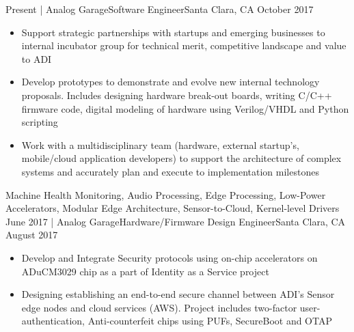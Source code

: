 %
%
%

\begin{experiences}
  \experience
    {Present}   {| Analog Garage}{Software Engineer}{Santa Clara, CA}
    {October 2017} {
                      \begin{itemize}
                        \item Support strategic partnerships with startups and emerging businesses to internal incubator group for technical merit, competitive landscape and value to ADI
                        \item Develop prototypes to demonstrate and evolve new internal technology proposals. Includes designing hardware break-out boards, writing C/C++ firmware code, digital modeling of hardware using Verilog/VHDL and Python scripting
                        \item Work with a multidisciplinary team (hardware, external startup’s, mobile/cloud application developers) to support the architecture of complex systems and accurately plan and execute to implementation milestones\\
                      \end{itemize}
                    }
                    {Machine Health Monitoring, Audio Processing, Edge Processing, Low-Power Accelerators, Modular Edge Architecture, Sensor-to-Cloud, Kernel-level Drivers}
  \emptySeparator
  \experience
    {June 2017}       {| Analog Garage}{Hardware/Firmware Design Engineer}{Santa Clara, CA}
    {August 2017}    {
                      \begin{itemize}
                        \item Develop and Integrate Security protocols using on-chip accelerators on ADuCM3029 chip as a part of Identity as a Service project
                        \item Designing establishing an end-to-end secure channel between ADI's Sensor edge nodes and cloud services (AWS). Project includes two-factor user-authentication, Anti-counterfeit chips using PUFs, SecureBoot and OTAP \\

\end{itemize}}
\end{experiences}
